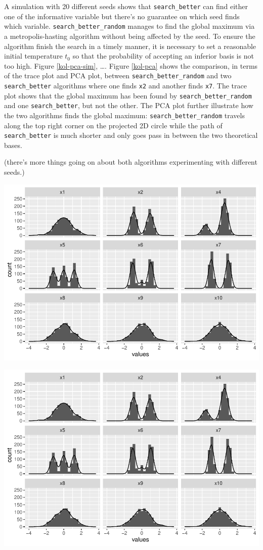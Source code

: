 \documentclass[12pt]{article}
\begin{document}
A simulation with 20 different seeds shows that \texttt{search\_better} can find either one of the informative variable but there's no guarantee on which seed finds which variable. \texttt{search\_better\_random} manages to find the global maximum via a metropolis-hasting algorithm without being affected by the seed. To ensure the algorithm finish the search in a timely manner, it is necessary to set a reasonable initial temperature \(t_0\) so that the probability of accepting an inferior basis is not too high. Figure \ref{kol-pca-sim}, \ldots{}. Figure \ref{kol-pca} shows the comparison, in terms of the trace plot and PCA plot, between \texttt{search\_better\_random} and two \texttt{search\_better} algorithms where one finds \texttt{x2} and another finds \texttt{x7}. The trace plot shows that the global maximum has been found by \texttt{search\_better\_random} and one \texttt{search\_better}, but not the other. The PCA plot further illustrate how the two algorithms finds the global maximum: \texttt{search\_better\_random} travels along the top right corner on the projected 2D circle while the path of \texttt{search\_better} is much shorter and only goes pass in between the two theoretical bases.

(there's more things going on about both algorithms experimenting with different seeds.)

\includegraphics{paper_files/figure-latex/unnamed-chunk-2-1.pdf}

\includegraphics{paper_files/figure-latex/unnamed-chunk-3-1.pdf}
\end{document}

